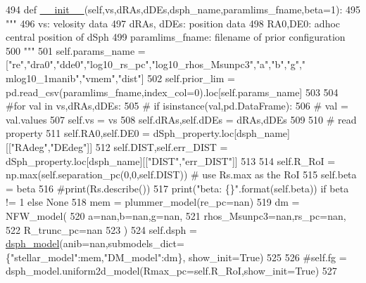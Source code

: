 \begin{DoxyCode}
494     \textcolor{keyword}{def }\hyperlink{classsampler_1_1Sampler_a0ebbb93e5c948bc426658cbdc92bfd12}{\_\_init\_\_}(self,vs,dRAs,dDEs,dsph\_name,paramlims\_fname,beta=1):
495         \textcolor{stringliteral}{"""}
496 \textcolor{stringliteral}{        vs: velosity data}
497 \textcolor{stringliteral}{        dRAs, dDEs: position data}
498 \textcolor{stringliteral}{        RA0,DE0: adhoc central position of dSph }
499 \textcolor{stringliteral}{        paramlims\_fname: filename of prior configuration}
500 \textcolor{stringliteral}{        """}
501         self.params\_name = [\textcolor{stringliteral}{"re"},\textcolor{stringliteral}{"dra0"},\textcolor{stringliteral}{"dde0"},\textcolor{stringliteral}{"log10\_rs\_pc"},\textcolor{stringliteral}{"log10\_rhos\_Msunpc3"},\textcolor{stringliteral}{"a"},\textcolor{stringliteral}{"b"},\textcolor{stringliteral}{"g"},\textcolor{stringliteral}{"
      mlog10\_1manib"},\textcolor{stringliteral}{"vmem"},\textcolor{stringliteral}{"dist"}]
502         self.prior\_lim = pd.read\_csv(paramlims\_fname,index\_col=0).loc[self.params\_name]
503         
504         \textcolor{comment}{#for val in vs,dRAs,dDEs:}
505         \textcolor{comment}{#    if isinstance(val,pd.DataFrame):}
506         \textcolor{comment}{#        val = val.values}
507         self.vs = vs
508         self.dRAs,self.dDEs = dRAs,dDEs
509         
510         \textcolor{comment}{# read property}
511         self.RA0,self.DE0 = dSph\_property.loc[dsph\_name][[\textcolor{stringliteral}{"RAdeg"},\textcolor{stringliteral}{"DEdeg"}]]
512         self.DIST,self.err\_DIST = dSph\_property.loc[dsph\_name][[\textcolor{stringliteral}{"DIST"},\textcolor{stringliteral}{"err\_DIST"}]]
513 
514         self.R\_RoI = np.max(self.separation\_pc(0,0,self.DIST)) \textcolor{comment}{# use Rs.max as the RoI}
515         self.beta = beta
516         \textcolor{comment}{#print(Rs.describe())}
517         print(\textcolor{stringliteral}{"beta: \{\}"}.format(self.beta)) \textcolor{keywordflow}{if} beta != 1 \textcolor{keywordflow}{else} \textcolor{keywordtype}{None}
518         mem = plummer\_model(re\_pc=nan)
519         dm = NFW\_model(
520             a=nan,b=nan,g=nan,
521             rhos\_Msunpc3=nan,rs\_pc=nan,
522             R\_trunc\_pc=nan
523         )
524         self.dsph = \hyperlink{namespacedsph__model}{dsph\_model}(anib=nan,submodels\_dict=\{\textcolor{stringliteral}{"stellar\_model"}:mem,\textcolor{stringliteral}{"DM\_model"}:dm\},
      show\_init=\textcolor{keyword}{True})
525         
526         \textcolor{comment}{#self.fg = dsph\_model.uniform2d\_model(Rmax\_pc=self.R\_RoI,show\_init=True)}
527 
\end{DoxyCode}


